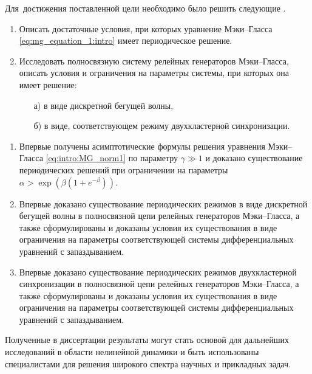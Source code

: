 Для~достижения поставленной цели необходимо было решить следующие {\tasks}.
\begin{enumerate}[beginpenalty=10000] %
	\item Описать достаточные условия, при которых уравнение Мэки--Гласса \eqref{eq:mg_equation_1:intro} имеет периодическое решение.
	\item Исследовать полносвязную систему релейных генераторов Мэки--Гласса, описать условия и ограничения на параметры системы, при которых она имеет решение:
	\begin{enumerate}
		\item[а)]в виде дискретной бегущей волны,
		\item[б)]в виде, соответствующем режиму двухкластерной синхронизации.
	\end{enumerate}
\end{enumerate}

\bigskip

{\novelty}
\begin{enumerate}[beginpenalty=10000] %
  \item Впервые получены асимптотические формулы решения уравнения Мэки--Гласса \eqref{eq:intro:MG_norm1} по параметру $\gamma \gg 1$ и доказано существование периодических решений при ограничении на параметры $\alpha > \exp\left(\beta(1 + e^{-\beta})\right)$.
  \item Впервые доказано существование периодических режимов в виде дискретной бегущей волны в полносвязной цепи релейных генераторов Мэки--Гласса, а также сформулированы и доказаны условия их существования в виде ограничения на параметры соответствующей системы дифференциальных уравнений с запаздыванием.
  \item Впервые доказано существование периодических режимов двухкластерной синхронизации в полносвязной цепи релейных генераторов Мэки--Гласса, а также сформулированы и доказаны условия их существования в виде ограничения на параметры соответствующей системы дифференциальных уравнений с запаздыванием.
\end{enumerate}

\bigskip

{\influence} Полученные в диссертации результаты могут стать основой для дальнейших исследований в области нелинейной динамики и быть использованы специалистами для решения широкого спектра научных и прикладных задач.

